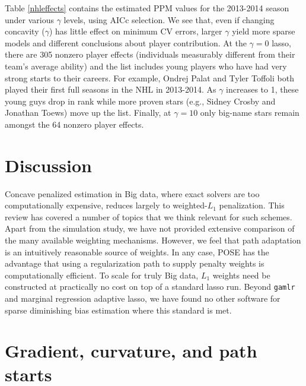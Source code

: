 \documentclass[12pt]{article}
\begin{document}
Table \ref{nhleffects} contains the estimated PPM values for the 2013-2014
season under various $\gamma$ levels, using AICc selection.  We see that, even
if changing concavity ($\gamma$) has little effect on minimum CV errors,
larger $\gamma$  yield more sparse models and different conclusions about
player contribution. At the $\gamma=0$ lasso, there are 305 nonzero player
effects (individuals measurably different from their team's average ability)
and the list includes young players who have had very strong starts to their
careers.  For example, Ondrej Palat and Tyler Toffoli both played their first
full seasons in the NHL in 2013-2014.  As $\gamma$ increases to 1, these young
guys  drop in rank while more proven stars (e.g., Sidney Crosby and Jonathan
Toews) move up the list.  Finally, at $\gamma=10$ only big-name stars remain
amongst the 64 nonzero player effects.

\section{Discussion}
\label{discussion}


Concave penalized estimation in Big data, where exact solvers are too
computationally expensive, reduces largely to weighted-$L_1$ penalization.
This review has covered a number of topics that we think relevant for such
schemes.  Apart from the simulation study, we have not provided extensive
comparison of the many available weighting mechanisms. However, we feel that
path adaptation is an intuitively reasonable source of weights. In any case,
POSE has the advantage that using a regularization path to supply penalty
weights is computationally efficient. To scale for truly Big data, $L_1$
weights need be constructed at practically no cost on top of a standard lasso
run. Beyond {\tt gamlr} and marginal regression adaptive lasso, we have found
no other software for sparse diminishing bias estimation where this standard
is met.






\appendix
\vskip 1cm

\section{Gradient, curvature, and path starts}
\label{models}
\end{document}
